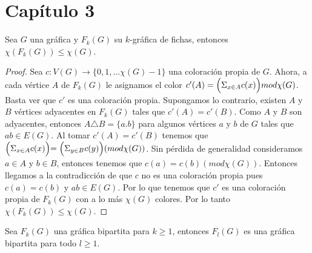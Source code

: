\chapter{Cap\'i{}tulo 3}%
\label{cap:num cromatico}



\begin{teorema}
    \label{teo:sexto}
    Sea $G$ una gr\'afica y $F_k(G)$ su $k$-gr\'afica de fichas, entonces
    $\chi(F_k(G)) \leq \chi (G)$.
\end{teorema}

\begin{proof}
    Sea $c: V(G) \rightarrow \{0,1, \dots \chi(G)-1\}$ una coloraci\'on
    propia de $G$. Ahora, a cada v\'ertice $A$ de $F_k(G)$ le asignamos el
    color $ c'(A)= \Bigl(\Sigma_{x \in A}c(x)\Bigl) mod \chi(G)$. Basta ver
    que $c'$ es una coloraci\'on propia. Supongamos lo contrario, existen
    $A$ y $B$ v\'ertices adyacentes en $F_k(G)$ tales que $c'(A) = c'(B)$.
    Como $A$ y $B$ son adyacentes, entonces $A \triangle B = \{a.b\}$ para
    algunos v\'ertices $a$ y $b$ de $G$ tales que $ab \in E(G)$. Al tomar
    $c'(A) = c'(B)$ tenemos que $\Bigl(\Sigma_{x \in A}c(x)\Bigl) =
    \Bigl(\Sigma_{y \in B}c(y)\Bigl) (mod \chi(G))$. Sin p\'erdida de
    generalidad consideramos $a \in A$ y $b \in B$, entonces tenemos que
    $c(a) = c(b) (mod \chi(G))$. Entonces llegamos a la contradicci\'on de
    que $c$ no es una coloraci\'on propia pues $c(a) = c(b)$ y $ab \in
    E(G)$. Por lo que tenemos que $c'$ es una coloraci\'on propia de
    $F_k(G)$ con a lo m\'as $\chi (G)$ colores. Por lo tanto $\chi(F_k(G))
    \leq \chi (G)$.
\end{proof}

\begin{proposicion}
    \label{prop:primera}
    Sea $F_k(G)$ una gr\'afica bipartita para $k \geq 1$, entonces $F_l(G)$
    es una gr\'afica bipartita para todo $l \geq 1$.
\end{proposicion}

